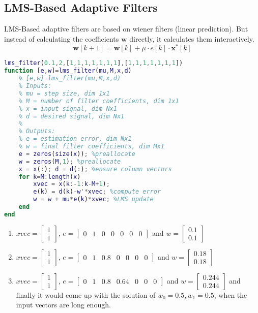 \subsection{LMS-Based Adaptive Filters}
LMS-Based adaptive filters are based on wiener filters (linear prediction). But instead of calculating the coefficients $\textbf{w}$ directly, it calculates them interactively. 
\begin{equation}
\boldsymbol{w}[k+1]=\boldsymbol{w}[k]+\mu \cdot e[k] \cdot \boldsymbol{x}^*[k]
\end{equation}
\begin{lstlisting}[language=Matlab]
lms_filter(0.1,2,[1,1,1,1,1,1,1],[1,1,1,1,1,1,1])
function [e,w]=lms_filter(mu,M,x,d)
    % [e,w]=lms_filter(mu,M,x,d)
    % Inputs:
    % mu = step size, dim 1x1
    % M = number of filter coefficients, dim 1x1
    % x = input signal, dim Nx1
    % d = desired signal, dim Nx1
    %
    % Outputs:
    % e = estimation error, dim Nx1
    % w = final filter coefficients, dim Mx1
    e = zeros(size(x)); %preallocate
    w = zeros(M,1); %preallocate
    x = x(:); d = d(:); %ensure column vectors
    for k=M:length(x)
        xvec = x(k:-1:k-M+1);
        e(k) = d(k)-w'*xvec; %compute error
        w = w + mu*e(k)*xvec; %LMS update
    end
end
\end{lstlisting}
\begin{enumerate}
    \item 
$xvec=
\begin{bmatrix}
1\\
1
\end{bmatrix}
$, 
$e=
\begin{bmatrix}
0&1&0&0&0&0&0
\end{bmatrix}
$ and 
$w=
\begin{bmatrix}
0.1\\
0.1
\end{bmatrix}
$
    \item 
$xvec=
\begin{bmatrix}
1\\
1
\end{bmatrix}
$, 
$e=
\begin{bmatrix}
0&1&0.8&0&0&0&0
\end{bmatrix}
$ and 
$w=
\begin{bmatrix}
0.18\\
0.18
\end{bmatrix}
$
    \item 
$xvec=
\begin{bmatrix}
1\\
1
\end{bmatrix}
$, 
$e=
\begin{bmatrix}
0&1&0.8&0.64&0&0&0
\end{bmatrix}
$ and 
$w=
\begin{bmatrix}
0.244\\
0.244
\end{bmatrix}
$\newline
and finally it would come up with the solution of $w_0=0.5, w_1=0.5$, when the input vectors are long enough.

\end{enumerate}


